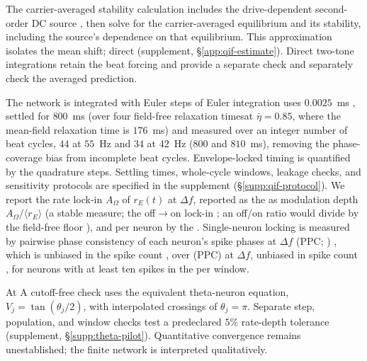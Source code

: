 \documentclass[11pt,a4paper]{article}
\newif\ifjne
\providecommand{\DIFaddtex}[1]{{\protect\color{blue} \sf #1}} %
\providecommand{\DIFdeltex}[1]{{\protect\color{red} \scriptsize #1}} %
\providecommand{\DIFaddbegin}{} %
\providecommand{\DIFaddend}{} %
\providecommand{\DIFdelbegin}{} %
\providecommand{\DIFdelend}{} %
\providecommand{\DIFadd}[1]{\texorpdfstring{\DIFaddtex{#1}}{#1}} %
\providecommand{\DIFdel}[1]{\texorpdfstring{\DIFdeltex{#1}}{}} %
\begin{document}
\DIFadd{The carrier-averaged stability calculation includes the drive-dependent
}\DIFaddend second-order DC source \DIFdelbegin \DIFdel{, then solve for the carrier-averaged
equilibrium and its stability, including the source's dependence on that equilibrium. This approximation isolates the mean shift; direct }\DIFdelend \DIFaddbegin \DIFadd{(supplement, \S\ref{app:qif-estimate}). Direct }\DIFaddend two-tone
integrations retain the beat \DIFdelbegin \DIFdel{forcing and provide a separate check }\DIFdelend \DIFaddbegin \DIFadd{and separately check the averaged prediction}\DIFaddend .

\DIFdelbegin \DIFdel{The network is integrated with Euler steps of }\DIFdelend \DIFaddbegin \DIFadd{Euler integration uses }\DIFaddend $0.0025$~ms \DIFdelbegin \DIFdel{, settled for $800$~ms (over
four field-free relaxation timesat $\bar\eta=0.85$, where the mean-field relaxation time is
$176$~ms) and measured over an integer number of beat cycles,
$44$ at $55$~Hz and $34$ at
$42$~Hz ($800$ and $810$~ms), removing the phase-coverage bias from incomplete
beat cycles.
Envelope-locked timing is quantified by the quadrature }\DIFdelend \DIFaddbegin \DIFadd{steps. Settling times, whole-cycle windows,
leakage checks, and sensitivity protocols are specified in the supplement
(\S\ref{supp:qif-protocol}).
We report the rate }\DIFaddend lock-in \DIFdelbegin \DIFdel{$A_\Omega$ of
$r_E(t)$ at $\Delta f$, reported as the }\DIFdelend \DIFaddbegin \DIFadd{as }\DIFaddend modulation depth
$A_\Omega/\langle r_E\rangle$\DIFdelbegin \DIFdel{(a
stable measure; the off$\to$on lock-in }\DIFdelend \DIFaddbegin \DIFadd{; an off/on }\DIFaddend ratio would divide by the
field-free floor\DIFdelbegin \DIFdel{), and
per neuron by the }\DIFdelend \DIFaddbegin \DIFadd{. Single-neuron locking is measured by }\DIFaddend pairwise phase
consistency \DIFdelbegin \DIFdel{of each neuron's spike phases at $\Delta f$
(PPC; \cite{vinck2010}) , which is unbiased in the spike count
, over }\DIFdelend \DIFaddbegin \DIFadd{(PPC) at $\Delta f$, unbiased in spike count
\cite{vinck2010}, for }\DIFaddend neurons with at least ten spikes \DIFdelbegin \DIFdel{in the }\DIFdelend \DIFaddbegin \DIFadd{per }\DIFaddend window.

\DIFdelbegin \DIFdel{At }\DIFdelend \DIFaddbegin \DIFadd{A cutoff-free check uses the equivalent theta-neuron equation,
$V_j=\tan(\theta_j/2)$, with interpolated crossings of $\theta_j=\pi$.
Separate step, population, and window checks test a predeclared $5\%$
rate-depth tolerance (supplement, \S\ref{supp:theta-pilot}). Quantitative
convergence remains unestablished; the finite network is interpreted qualitatively.
}\ifjne\else
\end{document}
